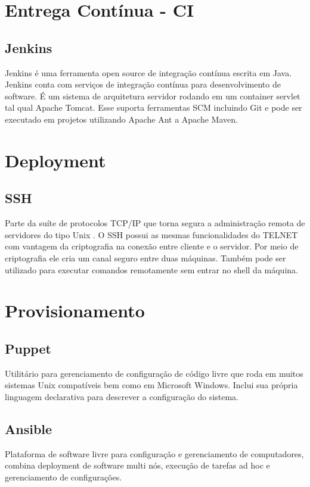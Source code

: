     \section{Entrega Contínua - CI}
	\subsection{Jenkins} Jenkins é uma ferramenta open source de 
	integração contínua escrita em Java. Jenkins conta com serviços 
	de integração contínua para desenvolvimento de software. 
	É um sistema de arquitetura servidor rodando em um container 
	servlet tal qual Apache Tomcat. Esse suporta ferramentas SCM 
	incluindo Git e pode ser executado em projetos utilizando 
	Apache Ant a Apache Maven.

    \section{Deployment}
	\subsection{SSH}Parte da suíte de protocolos TCP/IP que torna 
	segura a administração remota de servidores do tipo Unix 
	\cite{barret2005ssh}. O SSH 
	possui as mesmas funcionalidades do TELNET com vantagem da 
	criptografia na conexão entre cliente e o servidor. 
	Por meio de criptografia ele cria um canal seguro entre 
	duas máquinas. Também pode ser utilizado para executar comandos 
	remotamente sem entrar no shell da máquina.

    \section{Provisionamento}

	\subsection{Puppet} Utilitário para gerenciamento de configuração de 
	código livre que roda em muitos sistemas Unix compatíveis bem como 
	em Microsoft Windows. Inclui sua própria linguagem declarativa para 
	descrever a configuração do sistema.

	\subsection{Ansible} Plataforma de software livre para configuração e 
	gerenciamento de computadores, combina deployment de software multi 
	nós, execução de tarefas ad hoc e gerenciamento de configurações.
	
